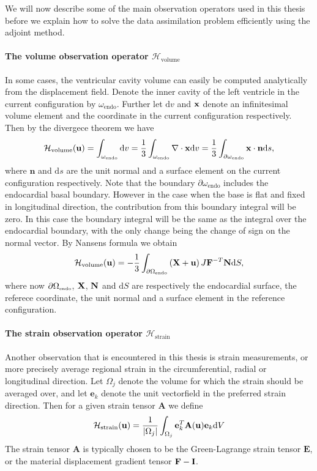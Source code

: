 We will now describe some of the main observation operators used in
this thesis before we explain how to solve the data assimilation
problem efficiently using the adjoint method. 


\paragraph{The volume observation operator
  $\mathcal{H}_{\mathrm{volume}}$}
In some cases, the ventricular cavity volume can easily be computed
analytically from the displacement field. Denote the inner cavity of
the left ventricle in the current configuration by
$\omega_{\mathrm{endo}}$. Further let $\mathrm{d} v$ and $\mathbf{x}$
denote an infinitesimal volume element and the coordinate in the
current configuration respectively. Then by the divergece theorem we have
\begin{align}
  \mathcal{H}_{\mathrm{volume}}(\mathbf{u})= \int_{\omega_{\mathrm{endo}}} \mathrm{d} v =
  \frac{1}{3}\int_{\omega_{\mathrm{endo}}} \nabla \cdot \mathbf{x} \mathrm{d} v =
  \frac{1}{3}\int_{\partial \omega_{\mathrm{endo}}} \mathbf{x} \cdot \mathbf{n} \mathrm{d} s, 
\end{align}
where $\mathbf{n}$ and $\mathrm{d} s$ are the unit normal and a surface
element on the current configuration respectively.
Note that the boundary $\partial \omega_{\mathrm{endo}}$ includes the
endocardial basal boundary. However in the case when the base is flat
and fixed in longitudinal direction, the contribution from this
boundary integral will be zero. In this case the boundary integral
will be the same as the integral over the endocardial boundary, with
the only change being the change of sign on the normal vector. By
Nansens formula we obtain 
\begin{align}
  \mathcal{H}_{\mathrm{volume}}(\mathbf{u})= -\frac{1}{3}\int_{\partial \Omega_{ \textnormal{\tiny \text{endo}}}} \left( \mathbf{X} + \mathbf{u} \right) J \mathbf{F}^{-T} \mathbf{N} \mathrm{d}S,
  \label{eq:volume_operator}
\end{align}
where now $\partial \Omega_{ \textnormal{\tiny \text{endo}}}$,  $\mathbf{X}$, $\mathbf{N}$ and $\mathrm{d}S$ are respectively the
endocardial surface, the referece coordinate, the unit normal and a
surface element in the reference configuration.


\paragraph{The strain observation operator
  $\mathcal{H}_{\mathrm{strain}}$}
Another observation that is encountered in this thesis is strain
measurements, or more precisely average regional strain in the
circumferential, radial or longitudinal direction. Let $\Omega_j$
denote the volume for which the strain should be averaged over, and
let $\mathbf{e}_k$ denote the unit vectorfield in the preferred strain
direction. Then for a given strain tensor $\mathbf{A}$ we define 
\begin{align}
  \mathcal{H}_{\mathrm{strain}}(\mathbf{u}) = \frac{1}{|\Omega_j|}\int_{\Omega_j} \mathbf{e}_k^T \mathbf{A}(\mathbf{u}) \mathbf{e}_k  \mathrm{d}V
\end{align}
The strain tensor $ \mathbf{A}$ is typically chosen to be the
Green-Lagrange strain tensor $\mathbf{E}$, or
the material displacement gradient tensor $\mathbf{F} - \mathbf{I}$.

